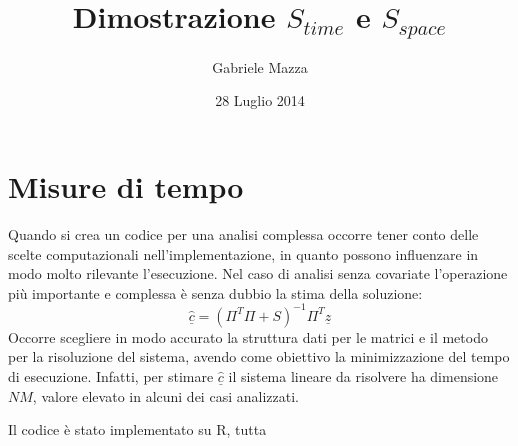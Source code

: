 \documentclass[a4paper,12pt]{report}							%
\date{28 Luglio 2014}
\author{Gabriele Mazza}
\title{Dimostrazione $S_{time}$ e $S_{space}$}
\begin{document}

\chapter{Misure di tempo}

Quando si crea un codice per una analisi complessa occorre tener conto delle scelte computazionali nell'implementazione, in quanto possono influenzare in modo molto rilevante l'esecuzione. Nel caso di analisi senza covariate l'operazione più importante e complessa è senza dubbio la stima della soluzione:
$$
\underline{\hat{c}}=(\Pi^T\Pi+S)^{-1}\Pi^T\underline{z}
$$
Occorre scegliere in modo accurato la struttura dati per le matrici e il metodo per la risoluzione del sistema, avendo come obiettivo la minimizzazione del tempo di esecuzione. Infatti, per stimare $\underline{\hat{c}}$ il sistema lineare da risolvere ha dimensione $NM$, valore elevato in alcuni dei casi analizzati.

Il codice è stato implementato su R, tutta
\end{document}
